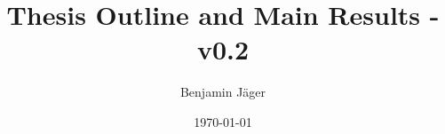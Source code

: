 

\endofdump


% 

\newif\ifIMAGES
\IMAGEStrue




\author{Benjamin Jäger}
\date{\today}
\title{Thesis Outline and Main Results - v0.2}





\maketitle




\tableofcontents


\newcommand{\chapterdir}{chapters}
%













